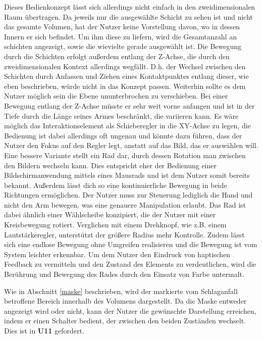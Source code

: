 Dieses Bedienkonzept lässt sich allerdings nicht einfach in den zweidimensionalen Raum übertragen. Da jeweils nur die ausgewählte Schicht zu sehen ist und nicht das gesamte Volumen, hat der Nutzer keine Vorstellung davon, wo in dessen Innern er sich befindet. Um ihm diese zu liefern, wird die Gesamtanzahl an schichten angezeigt, sowie die wievielte gerade ausgewählt ist. 
Die Bewegung durch die Schichten erfolgt außerdem entlang der Z-Achse, die durch den zweidimensionalen Kontext allerdings wegfällt. D.h. der Wechsel zwischen den Schichten durch Anfassen und Ziehen eines Kontaktpunktes entlang dieser, wie eben beschrieben, würde nicht in das Konzept passen. 
Weiterhin sollte es dem Nutzer möglich sein die Ebene ununterbrochen zu verschieben. Bei einer Bewegung entlang der Z-Achse müsste er sehr weit vorne anfangen und ist in der Tiefe durch die Länge seines Armes beschränkt, die  variieren kann. Es wäre möglich das Interaktionselement als Schieberegler in die XY-Achse zu legen, die Bedienung ist dabei allerdings oft ungenau und könnte dazu führen, dass der Nutzer den Fokus auf den Regler legt, anstatt auf das Bild, das er auswählen will. Eine bessere Variante stellt ein Rad dar, durch dessen Rotation man zwischen den Bildern wechseln kann. Dies entspricht eher der Bedienung einer Bildschirmanwendung mittels eines Mausrads und ist dem Nutzer somit bereits bekannt. Außerdem lässt dich so eine kontinuierliche Bewegung in beide Richtungen ermöglichen. Der Nutzer muss zur Steuerung lediglich die Hand und nicht den Arm bewegen, was eine genauere Manipulation erlaubt. 
Das Rad ist dabei ähnlich einer Wählscheibe konzipiert, die der Nutzer mit einer Kreisbewegung rotiert. Verglichen mit einem Drehknopf, wie z.B. einem Lautstärkeregler, unterstützt der größere Radius mehr Kontrolle. Zudem lässt sich eine endlose Bewegung ohne Umgreifen realisieren und die Bewegung ist vom System leichter erkennbar. 
Um dem Nutzer den Eindruck von haptischen Feedback zu vermitteln und den Zustand des Elements zu verdeutlichen, wird die Berührung und Bewegung des Rades durch den Einsatz von Farbe untermalt.


Wie in Abschnitt \ref{maske} beschrieben, wird der markierte vom Schlaganfall betroffene Bereich innerhalb des Volumens dargestellt. Da die Maske entweder angezeigt wird oder nicht, kann der Nutzer die gewünschte Darstellung erreichen, indem er einen Schalter bedient, der zwischen den beiden Zuständen wechselt. Dies ist in \textbf{U11} gefordert.

